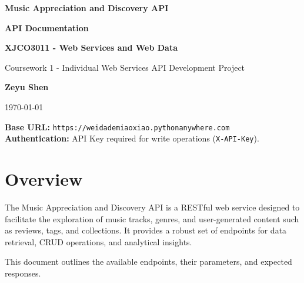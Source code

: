 \documentclass[11pt,a4paper]{article}
\begin{document}
\begin{titlepage}
    \centering
    \vspace*{2cm}
    
    {\Huge\bfseries\color{primary} Music Appreciation and Discovery API\par}
    \vspace{1cm}
    {\huge\bfseries API Documentation\par}
    \vspace{1.5cm}
    
    {\Large\bfseries XJCO3011 - Web Services and Web Data\par}
    \vspace{0.5cm}
    {\large Coursework 1 - Individual Web Services API Development Project\par}
    
    \vspace{2cm}
    
    {\Large\bfseries Zeyu Shen\par}
    \vspace{0.5cm}
    {\large \today\par}
    
    \vfill
    
    \begin{tcolorbox}[colback=white,colframe=secondary,boxrule=1pt,arc=4pt,width=0.8\textwidth,center]
    \centering
    \textbf{Base URL:} \texttt{https://weidademiaoxiao.pythonanywhere.com} \\
    \textbf{Authentication:} API Key required for write operations (\texttt{X-API-Key}).
    \end{tcolorbox}
    
    \vspace{1cm}
\end{titlepage}

\newpage
\tableofcontents
\newpage

\section{Overview}

The Music Appreciation and Discovery API is a RESTful web service designed to facilitate the exploration of music tracks, genres, and user-generated content such as reviews, tags, and collections. It provides a robust set of endpoints for data retrieval, CRUD operations, and analytical insights.

This document outlines the available endpoints, their parameters, and expected responses.
\end{document}
